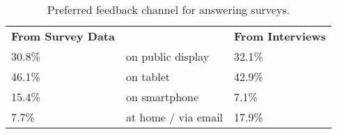 \begin{table}[h]
\center
\begin{tabular}{lllll}
\multicolumn{2}{l}{\textbf{From Survey Data}} &  & \multicolumn{2}{l}{\textbf{From Interviews}} \\
30.8\%                   & \multicolumn{3}{l}{on public display}      & 32.1\%                  \\
46.1\%                   & \multicolumn{3}{l}{on tablet}              & 42.9\%                  \\
15.4\%                   & \multicolumn{3}{l}{on smartphone}          & 7.1\%                   \\
7.7\%                    & \multicolumn{3}{l}{at home / via email}    & 17.9\%                 
\end{tabular}
\caption[Feedback Channel]{Preferred feedback channel for answering surveys.}
\label{table:5-feedback-channel}
\end{table}